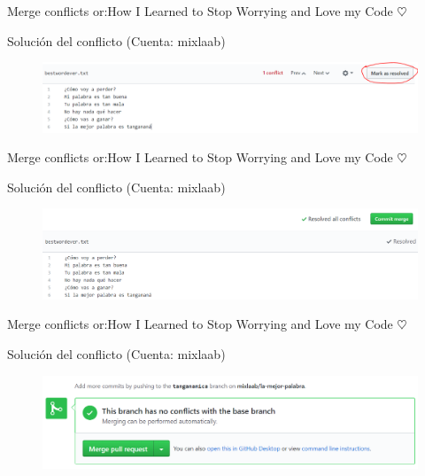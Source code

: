 \documentclass[10pt]{beamer}
\begin{document}
\begin{frame}{Merge conflicts or:}{How I Learned to Stop Worrying and Love my Code $\heartsuit$}

\begin{block}{Solución del conflicto (Cuenta: mixlaab)}

\begin{figure}[h!]
\centering
\includegraphics [scale=0.25]{conflict7}
\label{fig:issues}
\end{figure}
    
\end{block}

\end{frame}

\begin{frame}{Merge conflicts or:}{How I Learned to Stop Worrying and Love my Code $\heartsuit$}

\begin{block}{Solución del conflicto (Cuenta: mixlaab)}

\begin{figure}[h!]
\centering
\includegraphics [scale=0.25]{conflict8}
\label{fig:issues}
\end{figure}
    
\end{block}

\end{frame}

\begin{frame}{Merge conflicts or:}{How I Learned to Stop Worrying and Love my Code $\heartsuit$}

\begin{block}{Solución del conflicto (Cuenta: mixlaab)}

\begin{figure}[h!]
\centering
\includegraphics [scale=0.25]{merge}
\label{fig:issues}
\end{figure}
    
\end{block}

\end{frame}
\end{document}
